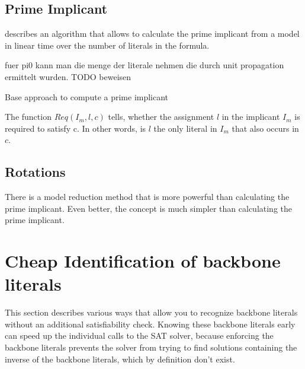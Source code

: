 \subsection{Prime Implicant}
\cite{dflbm13} describes an algorithm that allows to calculate the prime implicant from a model in linear time over the number of literals in the formula.


fuer pi0 kann man die menge der literale nehmen die durch unit propagation ermittelt wurden. TODO beweisen

\begin{algorithm}
\caption{{\sc Base approach to compute a prime implicant }}
\DontPrintSemicolon
{}

\;

\end{algorithm}

The function $Req(I_m,l,c)$ tells, whether the assignment $l$ in the implicant $I_m$ is required to satisfy c. In other words, is $l$ the only literal in $I_m$ that also occurs in $c$.

\subsection{Rotations}
There is a model reduction method that is more powerful than calculating the prime implicant. Even better, the concept is much simpler than calculating the prime implicant.






\section{Cheap Identification of backbone literals}
This section describes various ways that allow you to recognize backbone literals without an additional satisfiability check. Knowing these backbone literals early can speed up the individual calls to the SAT solver, because enforcing the backbone literals prevents the solver from trying to find solutions containing the inverse of the backbone literals, which by definition don't exist.


